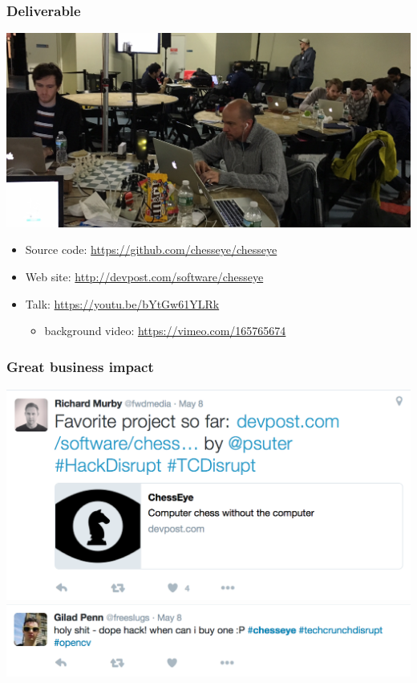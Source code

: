 \documentclass[t]{beamer}
\begin{document}
\begin{frame}[fragile]
\frametitle{Deliverable}

\begin{center}
  \includegraphics[scale=0.15]{figures/photo-deliverable}
\end{center}

\begin{itemize}
\item Source code: \url{https://github.com/chesseye/chesseye}
  \medskip
\item Web site: \url{http://devpost.com/software/chesseye}
  \medskip
\item Talk: \url{https://youtu.be/bYtGw61YLRk}
  \begin{itemize}
  \item background video: \url{https://vimeo.com/165765674}
  \end{itemize}
\end{itemize}


\end{frame}


\begin{frame}[fragile]
\frametitle{Great business impact}

\begin{center}
  \includegraphics[scale=0.5]{figures/tweet1}\\
  \includegraphics[scale=0.5]{figures/tweet2}
\end{center}

\end{frame}




\end{document}
